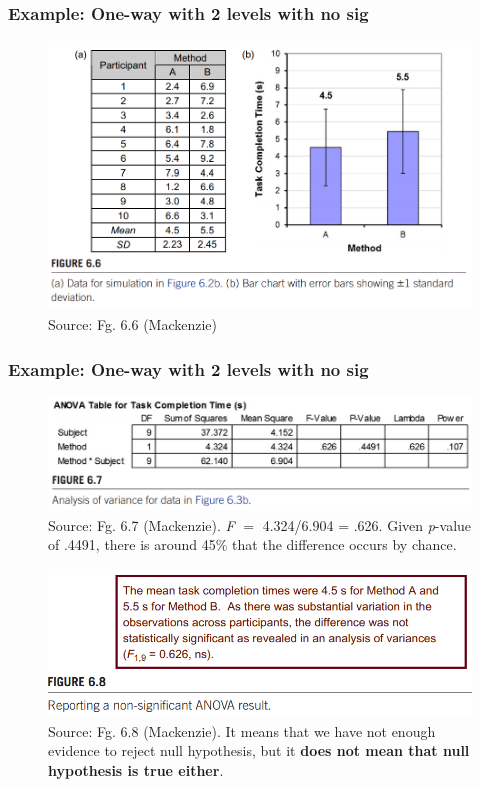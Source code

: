 \documentclass{beamer}
\begin{document}
\begin{frame}
	\frametitle{Example: One-way with 2 levels with no sig} 
	\begin{figure}
		\includegraphics[width=0.8\linewidth]{resultb}
		\caption{Source: Fg. 6.6 (Mackenzie)}
	\end{figure}
\end{frame}
%
\begin{frame}
	\frametitle{Example: One-way with 2 levels with no sig} 
	\begin{figure}
		\includegraphics[width=0.55\linewidth]{resultb2}
		\caption{Source: Fg. 6.7 (Mackenzie). \textit{F} $=$ 4.324/6.904 = .626.  Given \textit{p}-value of .4491, there is around 45\% that the difference occurs by chance.}
	\end{figure}
	\begin{figure}
		\includegraphics[width=0.55\linewidth]{resultb3}
		\caption{Source: Fg. 6.8 (Mackenzie).  It means that we have not enough evidence to reject null hypothesis, but it \textbf{does not mean that null hypothesis is true either}.}
	\end{figure}
\end{frame}
\end{document}
